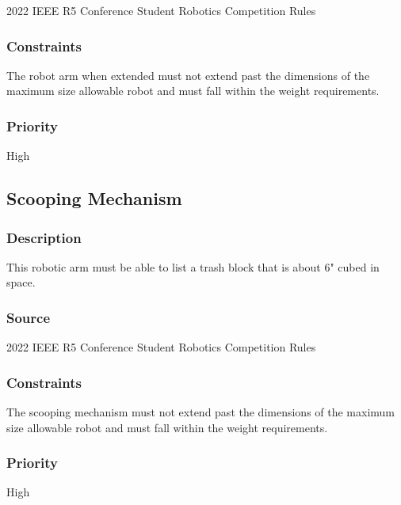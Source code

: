 2022 IEEE R5 Conference Student Robotics Competition Rules

\subsubsection{Constraints}

The robot arm when extended must not extend past the dimensions of the maximum size allowable robot and must fall within the weight requirements.

\subsubsection{Priority}

High


\subsection{Scooping Mechanism}

\subsubsection{Description}

This robotic arm must be able to list a trash block that is about 6" cubed in space.

\subsubsection{Source}

2022 IEEE R5 Conference Student Robotics Competition Rules

\subsubsection{Constraints}

The scooping mechanism must not extend past the dimensions of the maximum size allowable robot and must fall within the weight requirements.

\subsubsection{Priority}

High